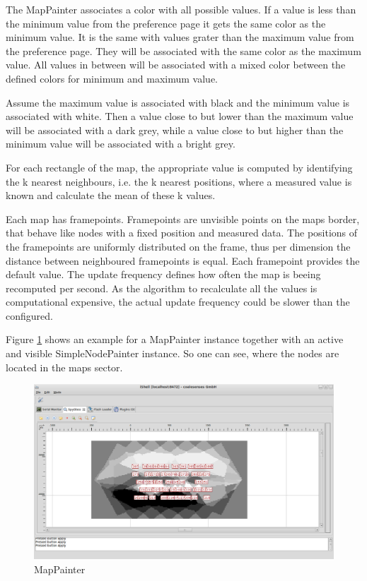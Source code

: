 The MapPainter associates a color with all possible values. If a value is less than the minimum value from the
preference page it gets the same color as the minimum value. It is the same with values grater than the maximum
value from the preference page. They will be associated with the same color as the maximum value. All values
in between will be associated with a mixed color between the defined colors for minimum and maximum value.

Assume the maximum value is associated with black and the minimum value is associated with white. Then a
value close to but lower than the maximum value will be associated with a dark grey, while a value close to
but higher than the minimum value will be associated with a bright grey.

For each rectangle of the map, the appropriate value is computed by identifying the k nearest neighbours,
i.e. the k nearest positions, where a measured value is known and calculate the mean of these k values.

Each map has framepoints. Framepoints are unvisible points on the maps border, that behave like nodes with
a fixed position and measured data. The positions of the framepoints are uniformly distributed on the frame, thus
per dimension the distance between neighboured framepoints is equal. Each framepoint provides the
default value. The update frequency defines how often the map is beeing recomputed per second. As the algorithm
to recalculate all the values is computational expensive, the actual update frequency could be slower than the
configured.

Figure \ref{pic:mp} shows an example for a MapPainter instance together with an active and visible SimpleNodePainter
instance. So one can see, where the nodes are located in the maps sector.

\begin{figure}[htb]
  \begin{center}
    \includegraphics[width=13.2cm]{./pics/mappainter}
    \caption{MapPainter}
    \label{pic:mp}
  \end{center}
\end{figure}

